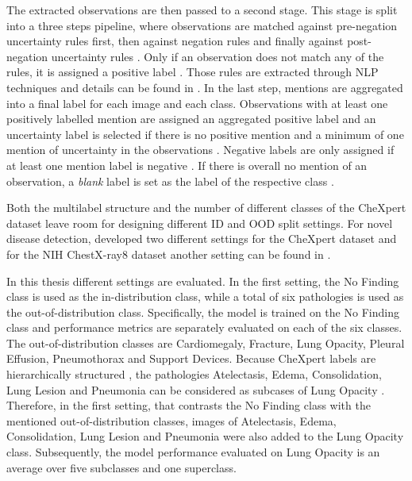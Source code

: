 The extracted observations are then passed to a second stage.
This stage is split into a three steps pipeline, where observations are matched against pre-negation uncertainty rules first, then against negation rules and finally against post-negation uncertainty rules \citep{Irvin2019}.
Only if an observation does not match any of the rules, it is assigned a positive label \citep{Irvin2019}.
Those rules are extracted through NLP techniques and details can be found in \citep{Irvin2019}.
In the last step, mentions are aggregated into a final label for each image and each class.
Observations with at least one positively labelled mention are assigned an aggregated positive label and an uncertainty label is selected if there is no positive mention and a minimum of one mention of uncertainty in the observations \citep{Irvin2019}.
Negative labels are only assigned if at least one mention label is negative \citep{Irvin2019}. 
If there is overall no mention of an observation, a \textit{blank} label is set as the label of the respective class \citep{Irvin2019}.
\par
Both the multilabel structure and the number of different classes of the CheXpert dataset leave room for designing different ID and OOD split settings.
For novel disease detection, \citep{Berger2021} developed two different settings for the CheXpert dataset and for the NIH ChestX-ray8 dataset \citep{Wang2017} another setting can be found in \citep{Cao2020}.
\par
In this thesis different settings are evaluated.
In the first setting, the No Finding class is used as the in-distribution class, while a total of six pathologies is used as the out-of-distribution class.
Specifically, the model is trained on the No Finding class and performance metrics are separately evaluated on each of the six classes.
The out-of-distribution classes are Cardiomegaly, Fracture, Lung Opacity, Pleural Effusion, Pneumothorax and Support Devices.
Because CheXpert labels are hierarchically structured \cite{Irvin2019}, the pathologies Atelectasis, Edema, Consolidation, Lung Lesion and Pneumonia can be considered as subcases of Lung Opacity \textcolor{red}{\citep{Hansell2008}}.
Therefore, in the first setting, that contrasts the No Finding class with the mentioned out-of-distribution classes, images of Atelectasis, Edema, Consolidation, Lung Lesion and Pneumonia were also added to the Lung Opacity class.
Subsequently, the model performance evaluated on Lung Opacity is an average over five subclasses and one superclass.
